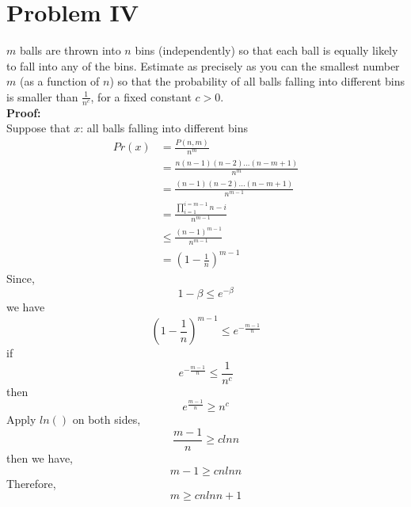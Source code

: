 \section{Problem IV}
$m$ balls are thrown into $n$ bins (independently) so that each ball is equally likely to fall into any of the bins. Estimate as precisely as you can the smallest number $m$ (as a function of $n$) so that the probability of all balls falling into different bins is smaller than $\frac{1}{n^{c}}$, for a fixed constant $c>0$.\\
\textbf{Proof:}\\
Suppose that $x$: all balls falling into different bins
\begin{align*}
Pr(x) &= \frac{P(n, m)}{n^m}\\
&= \frac{n(n-1)(n-2)...(n-m+1)}{n^m}\\
&= \frac{(n-1)(n-2)...(n-m+1)}{n^{m - 1}}\\
&= \frac{\prod_{i=1}^{i=m-1}n - i}{n^{m - 1}}\\
&\leq \frac{(n-1)^{m-1}}{n^{m - 1}}\\
&= (1 - \frac{1}{n})^{m - 1}
\end{align*}
Since,
$$ 1 - \beta \leq e^{-\beta} $$
we have
$$ (1 - \frac{1}{n})^{m - 1} \leq e^{-\frac{m-1}{n}} $$
if 
$$ e^{-\frac{m-1}{n}} \leq \frac{1}{n^c} $$
then
$$ e^{\frac{m-1}{n}} \geq n^c$$
Apply $ln()$ on both sides,
$$ \frac{m-1}{n} \geq clnn $$
then we have,
$$ m - 1 \geq cnlnn $$
Therefore,
$$ m \geq cnlnn + 1$$
